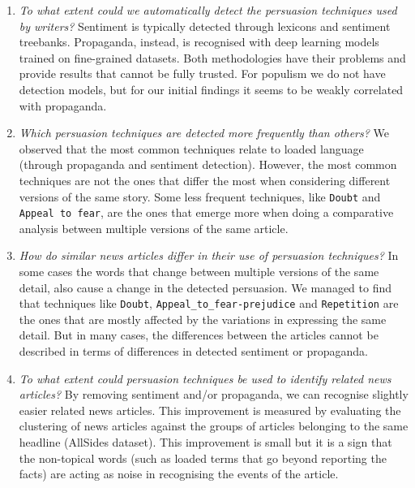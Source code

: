 \begin{enumerate}[label={\textbf{RQ2.\arabic*:}},leftmargin=2cm]
    \item \emph{To what extent could we automatically detect the persuasion techniques used by writers?} Sentiment is typically detected through lexicons and sentiment treebanks. Propaganda, instead, is recognised with deep learning models trained on fine-grained datasets. Both methodologies have their problems and provide results that cannot be fully trusted. For populism we do not have detection models, but for our initial findings it seems to be weakly correlated with propaganda.
    \item \emph{Which persuasion techniques are detected more frequently than others?} We observed that the most common techniques relate to loaded language (through propaganda and sentiment detection). However, the most common techniques are not the ones that differ the most when considering different versions of the same story. %
    Some less frequent
    techniques, like \texttt{Doubt} and \texttt{Appeal to fear}, are the ones that emerge more when doing a comparative analysis between multiple versions of the same article.
    \item \emph{How do similar news articles differ in their use of persuasion techniques?} In some cases the words that change between multiple versions of the same detail, also cause a change in the detected persuasion. We managed to find that techniques like \texttt{Doubt}, \texttt{Appeal\_to\_fear-prejudice} and \texttt{Repetition} are the ones that are mostly affected by the variations in expressing the same detail. But in many cases, the differences between the articles cannot be described in terms of differences in detected sentiment or propaganda. %
    \item \emph{To what extent could persuasion techniques be used to identify related news articles?} By removing sentiment and/or propaganda, we can recognise slightly easier related news articles.
    This improvement is measured by evaluating the clustering of news articles against the groups of articles belonging to the same headline (AllSides dataset). 
    This improvement is small but it is a sign that the non-topical words (such as loaded terms that go beyond reporting the facts) are acting as noise in recognising the events of the article. %
\end{enumerate}


